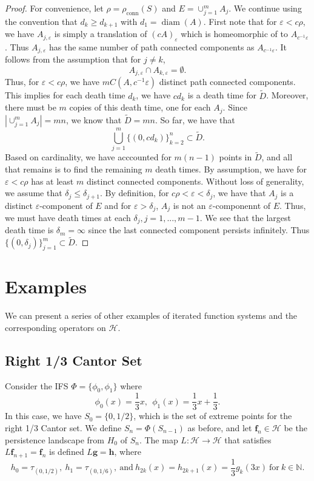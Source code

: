 \documentclass [52pt] {article}
\newcommand{\N}{\mathbb{N}}
\newcommand{\Hil}{\mathcal{H}}
\DeclareMathOperator{\diam}{diam}
\begin{document}
\begin{proof}
For convenience, let $\rho = \rho_{\mathrm{conn}}(S)$ and $E = \cup_{j=1}^m A_j$.  We continue using the convention that $d_k\ge d_{k+1}$ with $d_1 = \diam(A)$.  First note that for $\varepsilon<c\rho$, we have $A_{j,\varepsilon}$ is simply a translation of $(cA)_\varepsilon$ which is homeomorphic of to $A_{c^{-1}\varepsilon}$.  Thus $A_{j,\varepsilon}$ has the same number of path connected components as $A_{c^{-1}\varepsilon}$.  It follows from the assumption that for $j\not = k$,
\[A_{j,\varepsilon}\cap A_{k,\varepsilon} = \emptyset.\]
Thus, for $\varepsilon < c\rho$, we have $mC(A,c^{-1}\varepsilon)$ distinct path connected components.  This implies for each death time $d_k$, we have $cd_k$ is a death time for $\tilde{D}$. Moreover, there must be $m$ copies of this death time, one for each $A_j$.  Since $\left| \cup_{j=1}^m A_j\right| = mn$, we know that $\tilde{D} = mn$.  So far, we have that 
\[\bigcup_{j=1}^m \{(0,cd_k)\}_{k=2}^n\subset \tilde{D}.\]
Based on cardinality, we have acccounted for $m(n-1)$ points in $\tilde{D}$, and all that remains is to find the remaining $m$ death times.  By assumption, we have for $\varepsilon<c\rho$ has at least $m$ distinct connected components.  Without loss of generality, we assume that $\delta_j\le \delta_{j+1}$.  By definition, for $c\rho <\varepsilon <\delta_j$, we have that $A_j$ is a distinct $\varepsilon$-component of $E$ and for $\varepsilon >\delta_j$, $A_j$ is not an $\varepsilon$-componennt of $E$.  Thus, we must have death times at each $\delta_j, j = 1,...,m-1$.  We see that the largest death time is $\delta_m = \infty$ since the last connected component persists infinitely.  Thus $\{(0,\delta_j)\}_{j=1}^m\subset \tilde{D}$.
\end{proof}


\section{Examples}
We can present a series of other examples of iterated function systems and the corresponding operators on $\mathcal{H}$. 
\subsection{Right 1/3 Cantor Set}
Consider the IFS $\Phi = \{\phi_0,\phi_1\}$ where
\[\phi_0(x) = \frac{1}{3}x,\:\:\phi_1(x) = \frac{1}{3}x+\frac{1}{3}.\]
In this case, we have $S_0 = \{0,1/2\}$, which is the set of extreme points for the right 1/3 Cantor set.  We define $S_n = \Phi(S_{n-1})$ as before, and let $\mathbf{f}_n\in\Hil$ be the persistence landscape from $H_0$ of $S_n$.  The map $L:\Hil\to\Hil$ that satisfies $L\mathbf{f}_{n+1} = \mathbf{f}_n$ is defined $L\mathbf{g} = \mathbf{h}$, where
\[h_0= \tau_{(0,1/2)},\: h_1 = \tau_{(0,1/6)},\:\text{and}\: h_{2k}(x) = h_{2k+1}(x) = \frac{1}{3}g_k(3x)\:\text{for}\: k\in\N.\]
\end{document}
